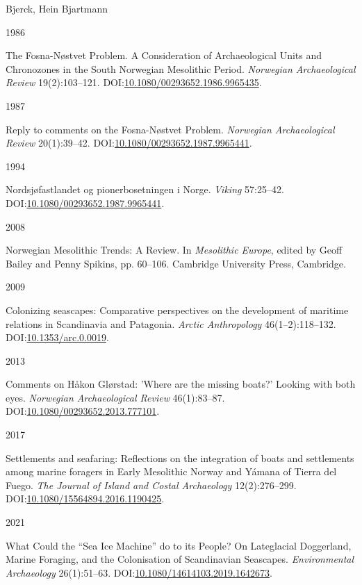 \documentclass[
  12pt,
  a4paper,
  oneside]{book}
\newlength{\cslhangindent}
\newlength{\csllabelwidth}
\newlength{\cslentryspacingunit} %
\newenvironment{CSLReferences}[2] %
 {%
  \setlength{\parindent}{0pt}
  \ifodd #1
  \let\oldpar\par
  \def\par{\hangindent=\cslhangindent\oldpar}
  \fi
  \setlength{\parskip}{#2\cslentryspacingunit}
 }%
 {}
\newcommand{\CSLBlock}[1]{#1\hfill\break}
\newcommand{\CSLLeftMargin}[1]{\parbox[t]{\csllabelwidth}{#1}}
\newcommand{\CSLRightInline}[1]{\parbox[t]{\linewidth - \csllabelwidth}{#1}\break}
\begin{document}
\begin{CSLReferences}{0}{0}
\leavevmode{}%
\CSLBlock{Bjerck, Hein Bjartmann}
\CSLLeftMargin{ 1986}
\CSLRightInline{{The Fosna-Nøstvet Problem. A Consideration of Archaeological Units and Chronozones in the South Norwegian Mesolithic Period}. \emph{Norwegian Archaeological Review} 19(2):103--121. DOI:\href{https://doi.org/10.1080/00293652.1986.9965435}{10.1080/00293652.1986.9965435}.}

\leavevmode{}%
\CSLLeftMargin{ 1987 }
\CSLRightInline{{Reply to comments on the Fosna-Nøstvet Problem}. \emph{Norwegian Archaeological Review} 20(1):39--42. DOI:\href{https://doi.org/10.1080/00293652.1987.9965441}{10.1080/00293652.1987.9965441}.}

\leavevmode{}%
\CSLLeftMargin{ 1994 }
\CSLRightInline{{Nordsjøfastlandet og pionerbosetningen i Norge}. \emph{Viking} 57:25--42. DOI:\href{https://doi.org/10.1080/00293652.1987.9965441}{10.1080/00293652.1987.9965441}.}

\leavevmode{}%
\CSLLeftMargin{ 2008 }
\CSLRightInline{{Norwegian Mesolithic Trends: A Review}. In \emph{{Mesolithic Europe}}, edited by Geoff Bailey and Penny Spikins, pp. 60--106. Cambridge University Press, Cambridge.}

\leavevmode{}%
\CSLLeftMargin{ 2009 }
\CSLRightInline{{Colonizing seascapes: Comparative perspectives on the development of maritime relations in Scandinavia and Patagonia}. \emph{Arctic Anthropology} 46(1--2):118--132. DOI:\href{https://doi.org/10.1353/arc.0.0019}{10.1353/arc.0.0019}.}

\leavevmode{}%
\CSLLeftMargin{ 2013 }
\CSLRightInline{{Comments on Håkon Glørstad: 'Where are the missing boats?' Looking with both eyes}. \emph{Norwegian Archaeological Review} 46(1):83--87. DOI:\href{https://doi.org/10.1080/00293652.2013.777101}{10.1080/00293652.2013.777101}.}

\leavevmode{}%
\CSLLeftMargin{ 2017 }
\CSLRightInline{{Settlements and seafaring: Reflections on the integration of boats and settlements among marine foragers in Early Mesolithic Norway and Yámana of Tierra del Fuego}. \emph{The Journal of Island and Costal Archaeology} 12(2):276--299. DOI:\href{https://doi.org/10.1080/15564894.2016.1190425}{10.1080/15564894.2016.1190425}.}

\leavevmode{}%
\CSLLeftMargin{ 2021 }
\CSLRightInline{{What Could the {``Sea Ice Machine''} do to its People? On Lateglacial Doggerland, Marine Foraging, and the Colonisation of Scandinavian Seascapes}. \emph{Environmental Archaeology} 26(1):51--63. DOI:\href{https://doi.org/10.1080/14614103.2019.1642673}{10.1080/14614103.2019.1642673}.}


\end{CSLReferences}
\end{document}
